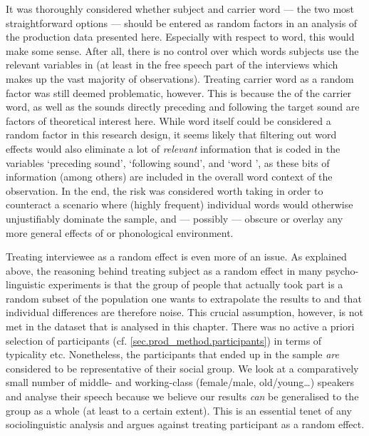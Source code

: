 It was thoroughly considered whether subject and carrier word --- the two most straightforward options --- should be entered as random factors in an analysis of the production data presented here.
Especially with respect to word, this would make some sense.
After all, there is no control over which words subjects use the relevant variables in (at least in the free speech part of the interviews which makes up the vast majority of observations).
Treating carrier word as a random factor was still deemed problematic, however.
This is because the  of the carrier word, as well as the sounds directly preceding and following the target sound are factors of theoretical interest here.
While word itself could be considered a random factor in this research design, it seems likely that filtering out word effects would also eliminate a lot of \emph{relevant} information that is coded in the variables `preceding sound', `following sound', and `word ', as these bits of information (among others) are included in the overall word context of the observation.
In the end, the risk was considered worth taking in order to counteract a scenario where (highly frequent) individual words would otherwise unjustifiably dominate the sample, and --- possibly --- obscure or overlay any more general effects of  or phonological environment.

Treating interviewee as a random effect is even more of an issue.
As explained above, the reasoning behind treating subject as a random effect in many psycho-linguistic experiments is that the group of people that actually took part is a random subset of the population one wants to extrapolate the results to and that individual differences are therefore noise.
This crucial assumption, however, is not met in the dataset that is analysed in this chapter.
There was no active a priori selection of participants (cf. \ref{sec.prod_method.participants}) in terms of typicality etc.
Nonetheless, the participants that ended up in the sample \emph{are} considered to be representative of their social group.
We look at a comparatively small number of middle- and working-class (female/male, old/young\ldots) speakers and analyse their speech because we believe our results \emph{can} be generalised to the group as a whole (at least to a certain extent).
This is an essential tenet of any sociolinguistic analysis and argues against treating participant as a random effect.

